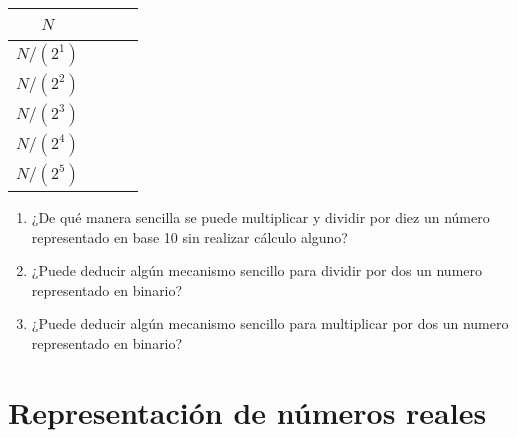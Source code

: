 \documentclass[12pt]{article}
\begin{document}
\begin{enumerate}
\begin{center}
\begin{tabular}[t]{|c|c|c|}
            \hline

                $N$ & \hspace{9em}~ &\hspace{9em}~\\

            \hline

                $N/(2^1)$ & ~ &~\\

            \hline

                $N/(2^2)$ & ~ &~\\

            \hline

                $N/(2^3)$ & ~ &~\\

            \hline

                $N/(2^4)$ & ~ &~\\

            \hline

                $N/(2^5)$ & ~ &~\\

            \hline

            \end{tabular}

        \end{center}

        \begin{enumerate}

            \item ¿De qué manera sencilla se puede multiplicar y dividir por diez un
                número representado en base 10 sin realizar cálculo alguno?

            \item ¿Puede deducir algún mecanismo sencillo para dividir por dos un
                numero representado en binario?

            \item ¿Puede deducir algún mecanismo sencillo para multiplicar por dos un
                numero representado en binario?

        \end{enumerate}

\end{enumerate}

\section{Representación de números reales}
\end{document}
